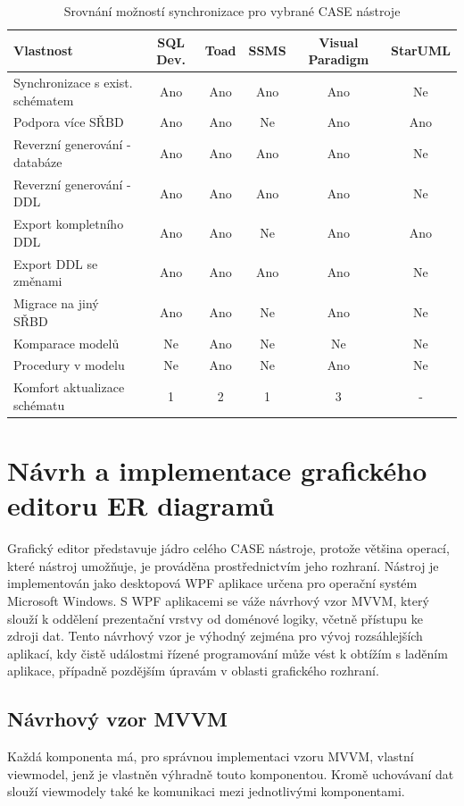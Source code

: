 \documentclass[czech,bachelor,public,dept460,male,oneside]{diploma}
\begin{document}
	\begin{table}[!h]
		\centering
		\caption{Srovnání možností synchronizace pro vybrané CASE nástroje}
		\label{tab:ddlCreateCmp}
		\begin{tabular}{l c c c c c}
			\toprule
			Vlastnost & SQL Dev. & Toad & SSMS & Visual Paradigm & StarUML \\
			\midrule
			Synchronizace s exist. schématem & Ano & Ano & Ano & Ano & Ne \\
			Podpora více SŘBD & Ano & Ano & Ne & Ano & Ano \\
			Reverzní generování - databáze & Ano & Ano & Ano & Ano & Ne \\
			Reverzní generování - DDL & Ano & Ano & Ano & Ano & Ne  \\
			Export kompletního DDL & Ano & Ano & Ne & Ano & Ano \\
			Export DDL se změnami & Ano & Ano & Ano & Ano & Ne \\
			Migrace na jiný SŘBD & Ano & Ano & Ne & Ano & Ne \\
			Komparace modelů & Ne & Ano & Ne & Ne & Ne \\
			Procedury v modelu & Ne & Ano & Ne & Ano & Ne \\
			Komfort aktualizace schématu & 1 & 2 & 1 & 3 & - \\
			\midrule
		\end{tabular}
	\end{table}
	
\newpage
\section{Návrh a implementace grafického editoru ER diagramů}
Grafický editor představuje jádro celého CASE nástroje, protože většina operací, které nástroj umožňuje, je prováděna prostřednictvím jeho rozhraní. Nástroj je implementován jako desktopová WPF aplikace určena pro operační systém Microsoft Windows. S WPF aplikacemi se váže návrhový vzor MVVM, který slouží k oddělení prezentační vrstvy od doménové logiky, včetně přístupu ke zdroji dat. Tento návrhový vzor je výhodný zejména pro vývoj rozsáhlejších aplikací, kdy čistě událostmi řízené programování může vést k obtížím s laděním aplikace, případně pozdějším úpravám v oblasti grafického rozhraní.
	
	\subsection{Návrhový vzor MVVM}
	Každá komponenta má, pro správnou implementaci vzoru MVVM, vlastní viewmodel, jenž je vlastněn výhradně touto komponentou. Kromě uchovávaní dat slouží viewmodely také ke komunikaci mezi jednotlivými komponentami. 
	
\end{document}
